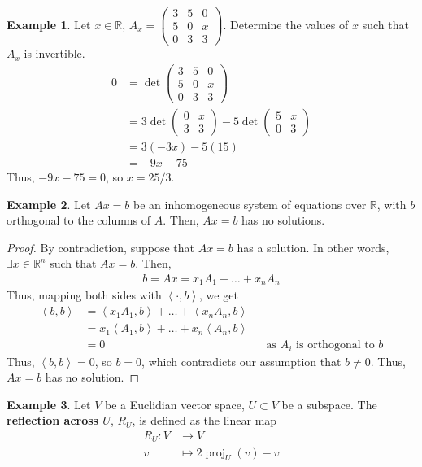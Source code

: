 \documentclass[letterpaper,12pt]{article}
\theoremstyle{definition}
\newtheorem*{example}{Example}
\newcommand{\inp}[2]{\left< #1, #2 \right>}
\begin{document}
\begin{example}
Let $x \in \mathbb{R}$, $A_x = \begin{pmatrix} 3 & 5 & 0 \\ 5 & 0 & x \\ 0 & 3 & 3 \end{pmatrix}$. Determine the values of $x$ such that $A_x$ is invertible.
\begin{align*}
    0 & = \det{\begin{pmatrix} 3 & 5 & 0 \\ 5 & 0 & x \\ 0 & 3 & 3 \end{pmatrix}} \\
    & = 3 \det{\begin{pmatrix} 0 & x \\ 3 & 3 \end{pmatrix}} - 5 \det{\begin{pmatrix} 5 & x \\ 0 & 3 \end{pmatrix}} \\
    & = 3(-3x) - 5(15) \\
    & = -9x - 75
\end{align*}
Thus, $-9x - 75 = 0$, so $x = 25/3$.
\end{example}


\begin{example}
Let $Ax = b$ be an inhomogeneous system of equations over $\mathbb{R}$, with $b$ orthogonal to the columns of $A$. Then, $Ax = b$ has no solutions.
\end{example}
\begin{proof}
By contradiction, suppose that $Ax = b$ has a solution. In other words, $\exists x \in \mathbb{R}^n$ such that $Ax = b$. Then,
\begin{align*}
    b = Ax = x_1A_1 + \dots + x_nA_n
\end{align*}
Thus, mapping both sides with $\inp{\cdot}{b}$, we get
\begin{align*}
    \inp{b}{b} & = \inp{x_1A_1}{b} + \dots + \inp{x_nA_n}{b} \\
    & = x_1 \inp{A_1}{b} + \dots + x_n \inp{A_n}{b} \\
    & = 0 && \text{as $A_i$ is orthogonal to $b$}
\end{align*}
Thus, $\inp{b}{b} = 0$, so $b = 0$, which contradicts our assumption that $b \neq 0$. Thus, $Ax = b$ has no solution.
\end{proof}


\begin{example}
Let $V$ be a Euclidian vector space, $U \subset V$ be a subspace. The \textbf{reflection across $U$}, $R_U$, is defined as the linear map
\begin{align*}
    R_U: V & \longrightarrow V \\
    v & \longmapsto 2 \operatorname{proj}_{U}(v) - v
\end{align*}
\end{example}
\end{document}
